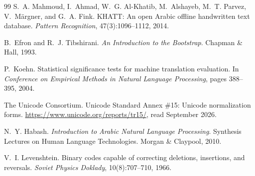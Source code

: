 \documentclass[11pt,a4paper]{article}
\begin{document}
\begin{thebibliography}{99}
S.~A. Mahmoud, I.~Ahmad, W.~G. Al-Khatib, M.~Alshayeb, M.~T. Parvez,
V.~M\"argner, and G.~A. Fink. KHATT: An open Arabic offline handwritten text
database. \emph{Pattern Recognition}, 47(3):1096--1112, 2014.

B.~Efron and R.~J. Tibshirani. \emph{An Introduction to the Bootstrap}.
Chapman \& Hall, 1993.

P.~Koehn. Statistical significance tests for machine translation evaluation.
In \emph{Conference on Empirical Methods in Natural Language Processing},
pages 388--395, 2004.

The Unicode Consortium. Unicode Standard Annex \#15: Unicode normalization
forms. \url{https://www.unicode.org/reports/tr15/}, read September 2026.

N.~Y. Habash. \emph{Introduction to Arabic Natural Language Processing}.
Synthesis Lectures on Human Language Technologies. Morgan \& Claypool, 2010.

V.~I. Levenshtein. Binary codes capable of correcting deletions, insertions,
and reversals. \emph{Soviet Physics Doklady}, 10(8):707--710, 1966.

\end{thebibliography}
\end{document}
